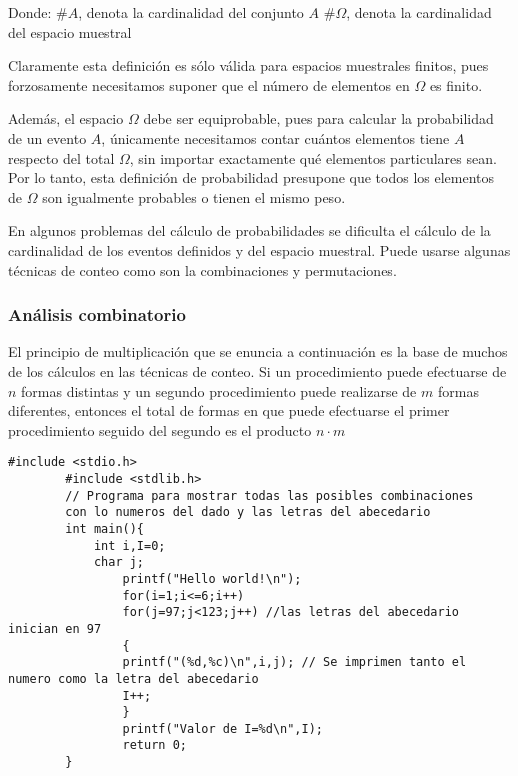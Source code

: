 Donde:
$\# A$, denota la cardinalidad del conjunto $A$
$\# \Omega$, denota la cardinalidad del espacio muestral

Claramente esta definición es sólo válida para espacios
muestrales finitos, pues forzosamente necesitamos
suponer que el número de elementos en $\Omega$ es finito.

Además, el espacio $\Omega$ debe ser equiprobable, pues para
calcular la probabilidad de un evento $A$, únicamente
necesitamos contar cuántos elementos tiene $A$ respecto del
total $\Omega$, sin importar exactamente qué elementos
particulares sean. Por lo tanto, esta definición de probabilidad presupone que
todos los elementos de $\Omega$ son igualmente probables o
tienen el mismo peso.

En algunos problemas del cálculo de probabilidades se
dificulta el cálculo de la cardinalidad de los eventos
definidos y del espacio muestral. Puede usarse algunas técnicas de conteo como son la
combinaciones y permutaciones.

\subsubsection{Análisis combinatorio}

\begin{definition}
    El principio de multiplicación que se enuncia a
    continuación es la base de muchos de los cálculos en las
    técnicas de conteo. Si un procedimiento puede efectuarse de $n$ formas
    distintas y un segundo procedimiento puede realizarse de
    $m$ formas diferentes, entonces el total de formas en que
    puede efectuarse el primer procedimiento seguido del
    segundo es el producto $n\cdot m$
\end{definition}

\begin{lstlisting}[style=cFrameTB, gobble=4]
        #include <stdio.h>
        #include <stdlib.h>
        // Programa para mostrar todas las posibles combinaciones 
        con lo numeros del dado y las letras del abecedario
        int main(){
            int i,I=0;
            char j;
                printf("Hello world!\n");
                for(i=1;i<=6;i++)
                for(j=97;j<123;j++) //las letras del abecedario inician en 97
                {
                printf("(%d,%c)\n",i,j); // Se imprimen tanto el numero como la letra del abecedario
                I++;
                }
                printf("Valor de I=%d\n",I);
                return 0;
        }
    \end{lstlisting}

